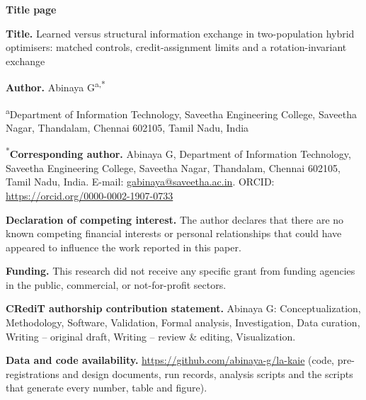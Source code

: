 \documentclass[11pt]{article}
\begin{document}
{\large\bfseries Title page}

\textbf{Title.} Learned versus structural information exchange in two-population hybrid optimisers: matched controls,
credit-assignment limits and a rotation-invariant exchange

\textbf{Author.} Abinaya G\textsuperscript{a,*}

\textsuperscript{a}Department of Information Technology, Saveetha Engineering College, Saveetha Nagar, Thandalam,
Chennai 602105, Tamil Nadu, India

\textsuperscript{*}\textbf{Corresponding author.} Abinaya G, Department of Information Technology, Saveetha
Engineering College, Saveetha Nagar, Thandalam, Chennai 602105, Tamil Nadu, India.
E-mail: \url{gabinaya@saveetha.ac.in}.
ORCID: \href{https://orcid.org/0000-0002-1907-0733}{https://orcid.org/0000-0002-1907-0733}

\textbf{Declaration of competing interest.} The author declares that there are no known competing financial interests
or personal relationships that could have appeared to influence the work reported in this paper.

\textbf{Funding.} This research did not receive any specific grant from funding agencies in the public, commercial, or
not-for-profit sectors.

\textbf{CRediT authorship contribution statement.} Abinaya G: Conceptualization, Methodology, Software, Validation,
Formal analysis, Investigation, Data curation, Writing -- original draft, Writing -- review \& editing, Visualization.

\textbf{Data and code availability.} \url{https://github.com/abinaya-g/la-kaie} (code, pre-registrations and design
documents, run records, analysis scripts and the scripts that generate every number, table and figure).
\end{document}
